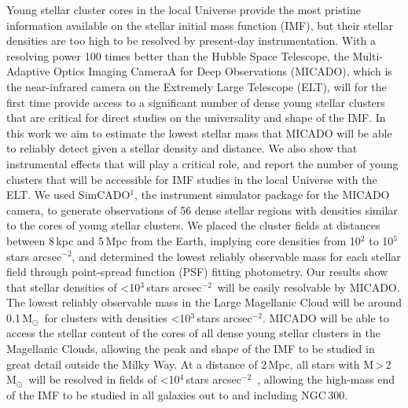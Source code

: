 \documentclass{aa}
\newcommand{\msun}{M$_\odot$~}
\newcommand{\h}[1]{$^{#1}$}
\newcommand{\spa}{stars arcsec$^{-2}$~}
\newcommand{\spae}{stars arcsec$^{-2}$}
\begin{document}
  \abstract
{Young stellar cluster cores in the local Universe provide the most pristine information available on the stellar initial mass function (IMF), but their stellar densities are too high to be resolved by present-day instrumentation.
With a resolving power 100 times better than the Hubble Space Telescope, the Multi-Adaptive Optics Imaging CameraA for Deep Observations (MICADO), which is the near-infrared camera on the Extremely Large Telescope (ELT), will for the first time provide access to a significant number of dense young stellar clusters that are critical for direct studies on the universality and shape of the IMF.}
{In this work we aim to estimate the lowest stellar mass that MICADO will be able to reliably detect given a stellar density and distance.
We also show that instrumental effects that will play a critical role, and report the number of young clusters that will be accessible for IMF studies in the local Universe with the ELT.}
{We used SimCADO$^1$, the instrument simulator package for the MICADO camera, to generate observations of 56 dense stellar regions with densities similar to the cores of young stellar clusters.
We placed the cluster fields at distances between 8\,kpc and 5\,Mpc from the Earth, implying core densities from 10\h2 to 10\h5\,\spae, and determined the lowest reliably observable mass for each stellar field through point-spread function (PSF) fitting photometry.}
{Our results show that stellar densities of \textless10\h3\,\spa will be easily resolvable by MICADO. The lowest reliably observable mass in the Large Magellanic Cloud will be around 0.1\,\msun for clusters with densities \textless10\h3\,\spae.
MICADO will be able to access the stellar content of the cores of all dense young stellar clusters in the Magellanic Clouds, allowing the peak and shape of the IMF to be studied in great detail outside the Milky Way.
At a distance of 2\,Mpc, all stars with M\,\textgreater\,2\,\msun will be resolved in fields of \textless10\h4\,\spa, allowing the high-mass end of the IMF to be studied in all galaxies out to and including NGC\,300.}
\end{document}
